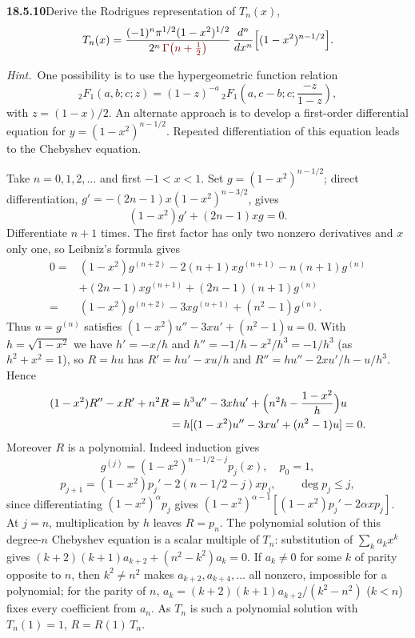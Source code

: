 \par\bigskip
\noindent\textbf{18.5.10}\quad Derive the Rodrigues representation
of $T_{n}(x)$,
\[
T_{n}(x)=\frac{(-1)^{n}\pi^{1/2}(1-x^{2})^{1/2}}
{2^{n}\,\erratum{\Gamma\big(n+\tfrac{1}{2}\big)}}\,
\frac{d^{n}}{dx^{n}}\Big[(1-x^{2})^{n-1/2}\Big].
\]
\par\emph{Hint.}~One possibility is to use the hypergeometric
function relation
\[
{}_{2}F_{1}(a,b;c;z)=(1-z)^{-a}\,
{}_{2}F_{1}\left(a,c-b;c;\frac{-z}{1-z}\right),
\]
with $z=(1-x)/2$. An alternate approach is to develop a first-order
differential equation for $y=(1-x^{2})^{n-1/2}$. Repeated
differentiation of this equation leads to the Chebyshev equation.
\par\nobreak
\solution
Take $n=0,1,2,\ldots$ and first $-1<x<1$.
Set $g=(1-x^2)^{n-1/2}$; direct differentiation,
$g'=-(2n-1)x(1-x^2)^{n-3/2}$, gives
\[
(1-x^2)g'+(2n-1)xg=0.
\]
Differentiate $n+1$ times.  The first factor has only two nonzero
derivatives and $x$ only one, so Leibniz's formula gives
\begin{align*}
0={}&(1-x^2)g^{(n+2)}-2(n+1)xg^{(n+1)}
     -n(n+1)g^{(n)}\\
 &+(2n-1)xg^{(n+1)}+(2n-1)(n+1)g^{(n)}\\
 ={}&(1-x^2)g^{(n+2)}-3xg^{(n+1)}+(n^2-1)g^{(n)}.
\end{align*}
Thus $u=g^{(n)}$ satisfies
$(1-x^2)u''-3xu'+(n^2-1)u=0$.
With $h=\sqrt{1-x^2}$ we have $h'=-x/h$ and
$h''=-1/h-x^2/h^3=-1/h^3$ (as $h^2+x^2=1$), so $R=hu$ has
$R'=hu'-xu/h$ and $R''=hu''-2xu'/h-u/h^3$.  Hence
\begin{align*}
(1-x^2)R''-xR'+n^2R
&=h^3u''-3xhu'+\Bigl(n^2h-\frac{1-x^2}h\Bigr)u\\
&=h[(1-x^2)u''-3xu'+(n^2-1)u]=0.
\end{align*}
Moreover $R$ is a polynomial.  Indeed induction gives
\[
g^{(j)}=(1-x^2)^{n-1/2-j}p_j(x),\quad p_0=1,
\]
\[
p_{j+1}=(1-x^2)p_j'-2(n-1/2-j)xp_j,
\qquad \deg p_j\le j,
\]
since differentiating $(1-x^2)^{\alpha}p_j$ gives
$(1-x^2)^{\alpha-1}[(1-x^2)p_j'-2\alpha xp_j]$.
At $j=n$, multiplication by $h$ leaves $R=p_n$.
The polynomial solution of this degree-$n$ Chebyshev equation
is a scalar multiple of $T_n$: substitution of
$\sum_ka_kx^k$ gives
$(k+2)(k+1)a_{k+2}+(n^2-k^2)a_k=0$.  If $a_k\ne0$ for some $k$ of
parity opposite to $n$, then $k^2\ne n^2$ makes
$a_{k+2},a_{k+4},\ldots$ all nonzero, impossible for a polynomial;
for the parity of $n$, $a_k=(k+2)(k+1)a_{k+2}/(k^2-n^2)$ ($k<n$)
fixes every coefficient from $a_n$.  As $T_n$ is such a polynomial
solution with $T_n(1)=1$, $R=R(1)\,T_n$.

